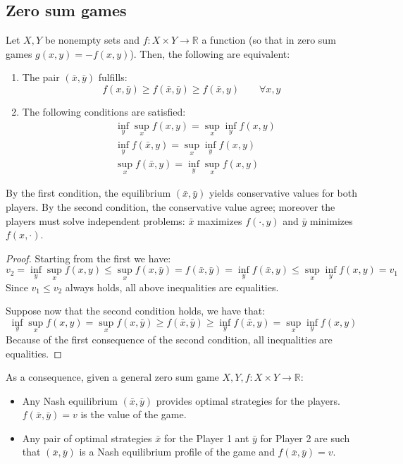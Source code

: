 \subsection{Zero sum games}
\begin{theorem}
    Let $X,Y$ be nonempty sets and $f:X\times Y \rightarrow \mathbb{R}$ a function (so that in zero sum games $g(x,y)=-f(x,y)$). 
    Then, the following are equivalent: 
    \begin{enumerate}
        \item The pair $(\bar{x},\bar{y})$ fulfills: 
            \[f(x,\bar{y})\geq f(\bar{x},\bar{y})\geq f(\bar{x},y)\qquad\forall x,y \]
        \item The following conditions are satisfied: 
        \begin{align*}
            &\inf_y\sup_x f(x,y)=\sup_x\inf_y f(x,y) \\
            &\inf_y f(\bar{x},y)=\sup_x\inf_y f(x,y) \\
            &\sup_x f(\bar{x},y)=\inf_y\sup_x f(x,y)
        \end{align*}
    \end{enumerate}
\end{theorem}
\noindent By the first condition, the equilibrium $(\bar{x},\bar{y})$ yields conservative values for both players. 
By the second condition, the conservative value agree; moreover the players must solve independent problems: $\bar{x}$ maximizes $f(\cdot,y)$ and $\bar{y}$ minimizes $f(x,\cdot)$.
\begin{proof}
    Starting from the first we have: 
    \[v_2=\inf_y\sup_x f(x,y)\leq \sup_x f(x, \bar{y})=f(\bar{x},\bar{y})=\inf_y f(\bar{x},y)\leq \sup_x\inf_y f(x,y)=v_1\]
    Since $v_1\leq v_2$ always holds, all above inequalities are equalities. 

    Suppose now that the second condition holds, we have that: 
    \[\inf_y\sup_x f(x,y)=\sup_x f(x,\bar{y})\geq f(\bar{x},\bar{y})\geq \inf_y f(\bar{x},y)=\sup_x\inf_y f(x,y)\]
    Because of the first consequence of the second condition, all inequalities are equalities. 
\end{proof}
\noindent As a consequence, given a general zero sum game $X,Y,f:X\times Y\rightarrow\mathbb{R}$:
\begin{itemize}
    \item Any Nash equilibrium $(\bar{x},\bar{y})$ provides optimal strategies for the players. 
        $f(\bar{x},\bar{y})=v$ is the value of the game. 
    \item Any pair of optimal strategies $\bar{x}$ for the Player 1 ant $\bar{y}$ for Player 2 are such that $(\bar{x},\bar{y})$ is a Nash equilibrium profile of the game and $f(\bar{x},\bar{y})=v$. 
\end{itemize}